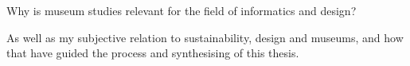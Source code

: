 
Why is museum studies relevant for the field of informatics and design?

As well as my subjective relation to sustainability, design and museums, and how that have guided the process and synthesising of this thesis.
